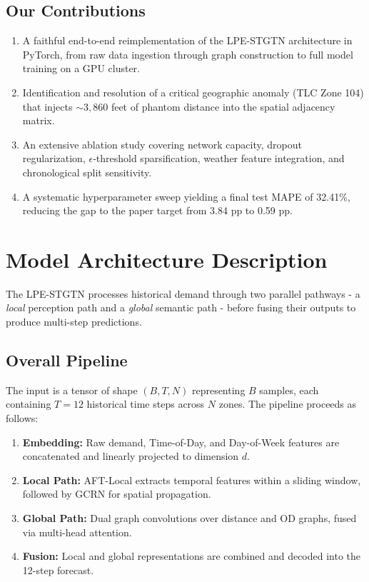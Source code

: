 \documentclass{rapportECL}
\begin{document}
\subsection{Our Contributions}
\begin{enumerate}[leftmargin=*]
    \item A faithful end-to-end reimplementation of the LPE-STGTN architecture in PyTorch, from raw data ingestion through graph construction to full model training on a GPU cluster.
    \item Identification and resolution of a critical geographic anomaly (TLC Zone 104) that injects ${\sim}3{,}860$ feet of phantom distance into the spatial adjacency matrix.
    \item An extensive ablation study covering network capacity, dropout regularization, $\epsilon$-threshold sparsification, weather feature integration, and chronological split sensitivity.
    \item A systematic hyperparameter sweep yielding a final test MAPE of 32.41\%, reducing the gap to the paper target from 3.84 pp to 0.59 pp.
\end{enumerate}

\section{Model Architecture Description}

The LPE-STGTN processes historical demand through two parallel pathways - a \emph{local} perception path and a \emph{global} semantic path - before fusing their outputs to produce multi-step predictions.

\subsection{Overall Pipeline}
The input is a tensor of shape $(B, T, N)$ representing $B$ samples, each containing $T{=}12$ historical time steps across $N$ zones. The pipeline proceeds as follows:

\begin{enumerate}[leftmargin=*]
    \item \textbf{Embedding:} Raw demand, Time-of-Day, and Day-of-Week features are concatenated and linearly projected to dimension $d$.
    \item \textbf{Local Path:} AFT-Local extracts temporal features within a sliding window, followed by GCRN for spatial propagation.
    \item \textbf{Global Path:} Dual graph convolutions over distance and OD graphs, fused via multi-head attention.
    \item \textbf{Fusion:} Local and global representations are combined and decoded into the 12-step forecast.
\end{enumerate}
\end{document}
